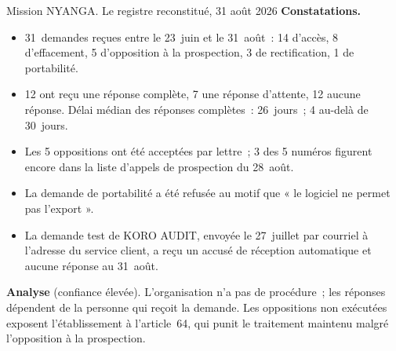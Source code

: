 \begin{boxscenario}{Mission NYANGA. Le registre reconstitué, 31 août 2026}
\textbf{Constatations.}
\begin{itemize}
    \item 31~demandes reçues entre le 23~juin et le 31~août~: 14 d'accès,
          8 d'effacement, 5 d'opposition à la prospection, 3 de
          rectification, 1 de portabilité.
    \item 12 ont reçu une réponse complète, 7 une réponse d'attente, 12
          aucune réponse. Délai médian des réponses complètes~: 26~jours~;
          4 au-delà de 30~jours.
    \item Les 5 oppositions ont été acceptées par lettre~; 3 des 5 numéros
          figurent encore dans la liste d'appels de prospection du 28~août.
    \item La demande de portabilité a été refusée au motif que « le
          logiciel ne permet pas l'export ».
    \item La demande test de KORO AUDIT, envoyée le 27~juillet par courriel à
          l'adresse du service client, a reçu un accusé de réception
          automatique et aucune réponse au 31~août.
\end{itemize}

\textbf{Analyse} (confiance élevée). L'organisation n'a pas de procédure~;
les réponses dépendent de la personne qui reçoit la demande. Les
oppositions non exécutées exposent l'établissement à l'article~64, qui
punit le traitement maintenu malgré l'opposition à la prospection.
\end{boxscenario}


